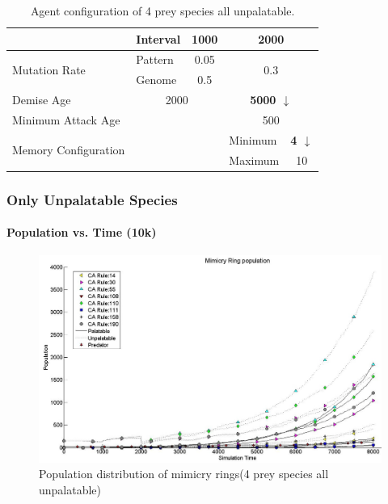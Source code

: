 {\begin{table}[H]
\begin{tiny}
\begin{spacing}{1.5}
\begin{tabular}{|l|l|c|c|l|c|}
	  						 									& Interval  & \multicolumn{2}{c|}{1000} & \multicolumn{2}{c|}{2000} \\ \hline
	  \multirow{2}{*}{Mutation Rate} & Pattern   & \multicolumn{2}{c|}{0.05} & \multicolumn{2}{c|}{\multirow{2}{*}{0.3}} \\ \cline{2-4}
	  						 									 & Genome    & \multicolumn{2}{c|}{0.5}  & \multicolumn{2}{c|}{} \\ \hline
	  Demise Age	 									 & \multicolumn{3}{c|}{2000}							& \multicolumn{2}{c|}{\textbf{5000 \(\downarrow\)}} \\ \hline
	  Minimum Attack Age						 & \multicolumn{3}{c|}{} 						    & \multicolumn{2}{c|}{500} \\ \hline
	  \multirow{2}{*}{Memory Configuration} & \multicolumn{3}{c|}{} 					& Minimum & \textbf{4 \(\downarrow\)} \\ \cline{5-6}
	   																			& \multicolumn{3}{c|}{} 					& Maximum & 10 \\ \hline  
	\end{tabular}
	\end{spacing}
	\end{tiny}
	\caption{Agent configuration of 4 prey species all unpalatable.}
	\label{tab:config-table-4-prey-unpalatable}
	\end{table}	

}

\frame
{
	\frametitle{Only Unpalatable Species}
	\framesubtitle{Population vs. Time (10k)}

	\begin{figure}[H]
		\centering
		\includegraphics[scale=0.25]{../tex/images/simTime8k-4Prey-unp}
		\caption{Population distribution of mimicry rings(4 prey species all unpalatable)}
		\label{fig:plot-4-prey-unp}
	\end{figure}

}

